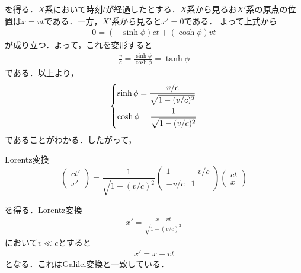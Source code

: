 \documentclass{report}
\begin{document}
  を得る．$X$系において時刻$t$が経過したとする．$X$系から見るお$X'$系の原点の位置は$x=vt$である．一方，$X'$系から見ると$x'=0$である．
  よって上式から
  \begin{align}
    0 = (-\sinh\phi)ct + (\cosh\phi)vt
  \end{align}
  が成り立つ．よって，これを変形すると
  \begin{align}
    \frac{v}{c} = \frac{\sinh\phi}{\cosh\phi} = \tanh\phi
  \end{align}
  である．以上より，
  \begin{align}
    \begin{dcases}
      \sinh\phi = \frac{v/c}{\sqrt{1- (v/c)^2}}\\
      \cosh\phi = \frac{1}{\sqrt{1- (v/c)^2}}
    \end{dcases}
  \end{align}
  であることがわかる．したがって，
  \begin{itembox}[l]{Lorentz変換}
    \begin{equation}
      \label{LorentzTransformation}
      \begin{pmatrix}
        ct' \\ x'
      \end{pmatrix}
      =
      \frac{1}{\sqrt{1 - (v/c)^2}}
      \begin{pmatrix}
        1 & -v/c\\
        -v/c & 1
      \end{pmatrix}
      \begin{pmatrix}
        ct\\x
      \end{pmatrix}
    \end{equation}
  \end{itembox}
  を得る．Lorentz変換
  \begin{align}
    x' = \frac{x-vt}{\sqrt{1-(v/c)^2}}
  \end{align}
  において$v \ll c$とすると
  \begin{align}
    x' = x - vt
  \end{align}
  となる．これはGalilei変換と一致している．
\end{document}
